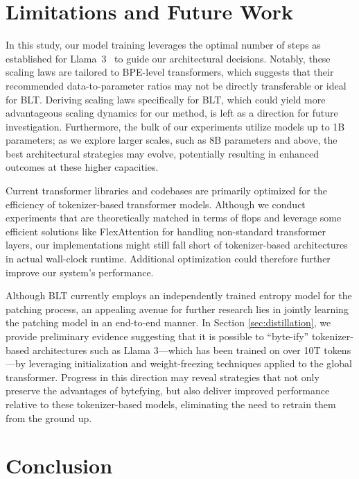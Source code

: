 \section{Limitations and Future Work}

In this study, our model training leverages the optimal number of steps as established for Llama~3~\citep{dubey2024llama} to guide our architectural decisions. Notably, these scaling laws are tailored to BPE-level transformers, which suggests that their recommended data-to-parameter ratios may not be directly transferable or ideal for {\textsc BLT}. Deriving scaling laws specifically for {\textsc BLT}, which could yield more advantageous scaling dynamics for our method, is left as a direction for future investigation. Furthermore, the bulk of our experiments utilize models up to 1B parameters; as we explore larger scales, such as 8B parameters and above, the best architectural strategies may evolve, potentially resulting in enhanced outcomes at these higher capacities.

Current transformer libraries and codebases are primarily optimized for the efficiency of tokenizer-based transformer models. Although we conduct experiments that are theoretically matched in terms of flops and leverage some efficient solutions like FlexAttention for handling non-standard transformer layers, our implementations might still fall short of tokenizer-based architectures in actual wall-clock runtime. Additional optimization could therefore further improve our system's performance.

Although {\textsc BLT} currently employs an independently trained entropy model for the patching process, an appealing avenue for further research lies in jointly learning the patching model in an end-to-end manner. In Section \ref{sec:distillation}, we provide preliminary evidence suggesting that it is possible to “byte-ify” tokenizer-based architectures such as Llama 3—which has been trained on over 10T tokens—by leveraging initialization and weight-freezing techniques applied to the global transformer. Progress in this direction may reveal strategies that not only preserve the advantages of bytefying, but also deliver improved performance relative to these tokenizer-based models, eliminating the need to retrain them from the ground up.

\section{Conclusion}
\label{section:conclusion}

